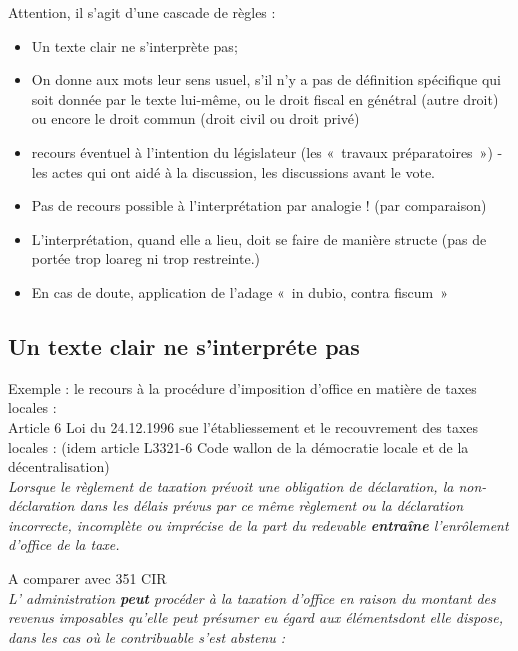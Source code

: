 \documentclass{book}
\begin{document}
Attention, il s'agit d'une cascade de règles :\\

\begin{itemize}
\item Un texte clair ne s'interprète pas;
\item On donne aux mots leur sens usuel, s'il n'y a pas de définition spécifique qui soit donnée par le texte lui-même, ou le droit fiscal en génétral (autre droit) ou encore le droit commun (droit civil ou droit privé)
\item recours éventuel à l'intention du législateur (les «~travaux préparatoires~») - les actes qui ont aidé à la discussion, les discussions avant le vote.
\item Pas de recours possible à l'interprétation par analogie ! (par comparaison)
\item L'interprétation, quand elle a lieu, doit se faire de manière structe (pas de portée trop loareg ni trop restreinte.)
\item En cas de doute, application de l'adage «~in dubio, contra fiscum~»
\end{itemize}

\subsection{Un texte clair ne s'interpréte pas}

Exemple : le recours à la procédure d'imposition d'office en matière de taxes locales :\\

Article 6 Loi du 24.12.1996 sue l'établiessement et le recouvrement des taxes locales : (idem article L3321-6 Code wallon de la démocratie locale et de la décentralisation)\\

\textit{Lorsque le règlement de taxation prévoit une obligation de déclaration, la non-déclaration dans
les délais prévus par ce même règlement ou la déclaration incorrecte, incomplète ou imprécise de la part du
redevable \textbf{entraîne} l’enrôlement d’office de la taxe.}

\null

A comparer avec 351 CIR\\

\textit{L' administration \textbf{peut} procéder à la taxation d'office en raison du montant des revenus imposables qu'elle peut présumer eu égard aux élémentsdont elle dispose, dans les cas où le contribuable s'est abstenu :}
   
\end{document}
